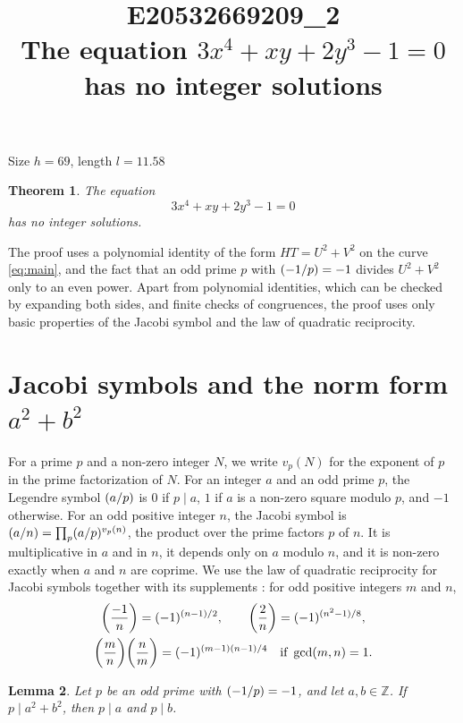 \documentclass[11pt]{article}
\title{\textbf{E20532669209\_2}\\[4pt] {\Large The equation $3x^{4}+xy+2y^{3}-1=0$ has no integer solutions}}
\author{}
\date{}
\newtheorem{theorem}{Theorem}
\newtheorem{lemma}[theorem]{Lemma}
\newcommand{\Z}{\mathbb{Z}}
\newcommand{\leg}[2]{\mathchoice{\biggl(\dfrac{#1}{#2}\biggr)}{(#1/#2)}{(#1/#2)}{(#1/#2)}}
\begin{document}
\maketitle
\vspace{-8ex}
\begin{center}
Size $h=69$, length $l=11.58$
\end{center}

\begin{theorem}\label{thm:main}
The equation
\begin{equation}\label{eq:main}
3x^{4}+xy+2y^{3}-1=0
\end{equation}
has no integer solutions.
\end{theorem}

The proof uses a polynomial identity of the form $HT=U^2+V^2$ on the curve \eqref{eq:main}, and the fact that an odd prime $p$ with $\leg{-1}{p}=-1$ divides $U^2+V^2$ only to an even power. Apart from polynomial identities, which can be checked by expanding both sides, and finite checks of congruences, the proof uses only basic properties of the Jacobi symbol and the law of quadratic reciprocity.

\section{\texorpdfstring{Jacobi symbols and the norm form $a^2+b^2$}{Jacobi symbols and the norm form}}

For a prime $p$ and a non-zero integer $N$, we write $v_p(N)$ for the exponent of $p$ in the prime factorization of $N$. For an integer $a$ and an odd prime $p$, the Legendre symbol $\leg{a}{p}$ is $0$ if $p\mid a$, $1$ if $a$ is a non-zero square modulo $p$, and $-1$ otherwise. For an odd positive integer $n$, the Jacobi symbol is $\leg{a}{n}=\prod_p\leg{a}{p}^{v_p(n)}$, the product over the prime factors $p$ of $n$. It is multiplicative in $a$ and in $n$, it depends only on $a$ modulo $n$, and it is non-zero exactly when $a$ and $n$ are coprime. We use the law of quadratic reciprocity for Jacobi symbols together with its supplements \cite[Chapter~5, \S2]{IR}: for odd positive integers $m$ and $n$,
\begin{gather*}
\leg{-1}{n}=(-1)^{(n-1)/2},\qquad\leg{2}{n}=(-1)^{(n^2-1)/8},\\
\leg{m}{n}\leg{n}{m}=(-1)^{(m-1)(n-1)/4}\quad\text{if }\gcd(m,n)=1.
\end{gather*}

\begin{lemma}\label{lem:divides}
Let $p$ be an odd prime with $\leg{-1}{p}=-1$, and let $a,b\in\Z$. If $p\mid a^2+b^2$, then $p\mid a$ and $p\mid b$.
\end{lemma}
\end{document}
